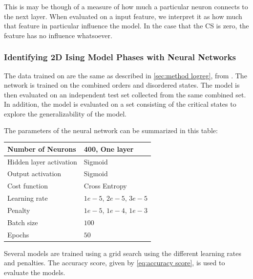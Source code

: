 This is may be though of a measure of how much a particular neuron connects to the next layer. When evaluated on a input feature, we interpret it as how much that feature in particular influence the model. In the case that the CS is zero, the feature has no influence whatsoever.

\subsubsection{Identifying 2D Ising Model Phases with Neural Networks}
The data trained on are the same as described in \autoref{sec:method logreg}, from \cite{Mehta_2019}. The network is trained on the combined orders and disordered states. The model is then evaluated on an independent test set collected from the same combined set. In addition, the model is evaluated on a set consisting of the critical states to explore the generalizability of the model. 

The parameters of the neural network can be summarized in this table:

\begin{table}[H]
\begin{tabular}{|l|l|}
\hline
Number of Neurons & 400, One layer  \\ \hline
Hidden layer activation & Sigmoid   \\ \hline
Output activation & Sigmoid  \\ \hline
Cost function & Cross Entropy \\ \hline
Learning rate & $1e-5$, $2e-5$, $3e-5$  \\ \hline
Penalty & $1e-5$, $1e-4$, $1e-3$  \\ \hline
Batch size & $100$  \\ \hline
Epochs & $50$  \\ \hline
\end{tabular}
\end{table}

Several models are trained using a grid search using the different learning rates 
and penalties. The accuracy score, given by \autoref{eq:accuracy score}, is used to evaluate the models.
